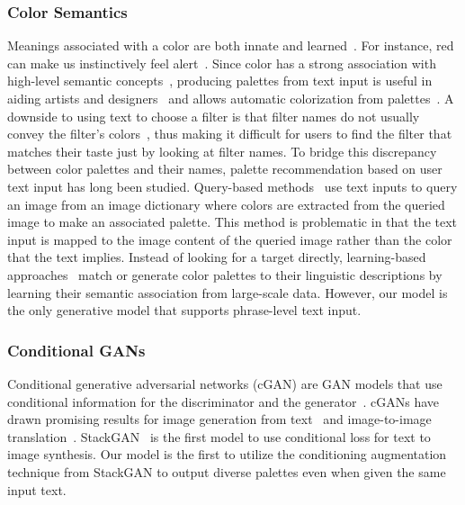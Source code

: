 \documentclass[runningheads]{llncs}
\begin{document}
\subsubsection{Color Semantics}
Meanings associated with a color are both innate and learned~\cite{crozier1996psychology}. For instance, red can make us instinctively feel alert~\cite{crozier1996psychology}. Since color has a strong association with high-level semantic concepts~\cite{de2001colours}, producing palettes from text input is useful in aiding artists and designers~\cite{kobayashi2009color} and allows automatic colorization from palettes~\cite{xiao2018interactive,cho2017palettenet}. A downside to using text to choose a filter is that filter names do not usually convey the filter's colors~\cite{liu2014autostyle}, thus making it difficult for users to find the filter that matches their taste just by looking at filter names. To bridge this discrepancy between color palettes and their names, palette recommendation based on user text input has long been studied. Query-based methods~\cite{liu2014autostyle,solli2010color} use text inputs to query an image from an image dictionary where colors are extracted from the queried image to make an associated palette. This method is problematic in that the text input is mapped to the image content of the queried image rather than the color that the text implies. Instead of looking for a target directly, learning-based approaches~\cite{jahanian2017colors,murray2012toward,mcmahan2015bayesian} match or generate color palettes to their linguistic descriptions by learning their semantic association from large-scale data. However, our model is the only generative model that supports phrase-level text input.  

\subsubsection{Conditional GANs}
Conditional generative adversarial networks (cGAN) are GAN models that use conditional information for the discriminator and the generator~\cite{mirza2014conditional}. cGANs have drawn promising results for image generation from text~\cite{reed2016generative,reed2016learning,zhang2017stackgan} and image-to-image translation~\cite{kim2017learning,isola2017image,choi2017stargan}. StackGAN~\cite{zhang2017stackgan} is the first model to use conditional loss for text to image synthesis. Our model is the first to utilize the conditioning augmentation technique from StackGAN to output diverse palettes even when given the same input text.
\end{document}

